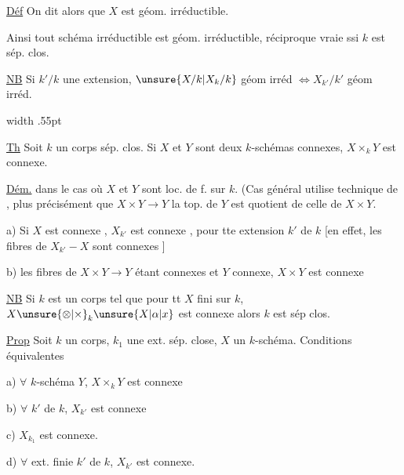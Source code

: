 \uline{Déf} On dit alors que $X$ est géom. irréductible.

Ainsi  tout schéma irréductible est géom. irréductible, réciproque vraie ssi $k$ est sép. clos.

\uline{NB} Si $k'/k$ une extension, $\unsure{X/k|X_k/k}$ géom irréd $\Longleftrightarrow X_{k'}/k'$ géom irréd. 

 

\noindent\vrule width .55pt\hspace{.5em}\begin{minipage}{.92\linewidth}
\uline{Th} Soit $k$ un corps sép. clos. Si $X$ et $Y$ sont deux $k$-schémas connexes, $X\times_k Y$ est connexe.

\end{minipage}\par
\uline{Dém.} dans le cas où $X$ et $Y$ sont loc. de  f. sur $k$. (Cas général utilise technique de , plus précisément que $X\times Y\longrightarrow Y$ la top. de $Y$ est quotient de celle de $X\times Y$.

a) Si $X$ est connexe , $X_{k'}$ est connexe , pour tte extension $k'$ de $k$ [en effet, les fibres de $X_{k'}-X$ sont connexes ]

b) les fibres de $X\times Y\to Y$ étant connexes  et $Y$ connexe, $X\times Y$ est connexe

\uline{NB} Si $k$ est un corps tel que pour tt $X$  fini sur $k$, $X\unsure{\otimes|\times}_k \unsure{X|\alpha|x}$ est connexe alors $k$ est sép clos.

\uline{Prop} Soit $k$ un corps, $k_1$ une ext.  sép. close, $X$ un $k$-schéma. Conditions équivalentes

a) $\forall$ $k$-schéma $Y$, $X\times_k Y$ est connexe

b) $\forall$  $k'$ de $k$, $X_{k'}$ est connexe

c)  $X_{k_1}$ est connexe.

d) $\forall$ ext. finie  $k'$ de $k$, $X_{k'}$ est connexe.


